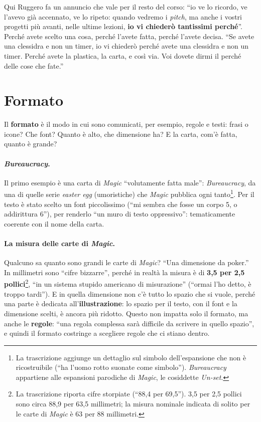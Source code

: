 Qui Ruggero fa un annuncio che vale per il resto del corso: ``io ve lo ricordo, ve
l'avevo già accennato, ve lo ripeto: quando vedremo i \emph{pitch}, ma anche i vostri
progetti più avanti, nelle ultime lezioni, \textbf{io vi chiederò tantissimi
perché}''. Perché avete scelto una cosa, perché l'avete fatta, perché l'avete decisa.
``Se avete una clessidra e non un timer, io vi chiederò perché avete una clessidra e non
un timer. Perché avete la plastica, la carta, e così via. Voi dovete dirmi il perché
delle cose che fate.''

\section{Formato}
\label{a10:sec:formato}



Il \textbf{formato} è il modo in cui sono comunicati, per esempio, regole e testi:
frasi o icone? Che font? Quanto è alto, che dimensione ha? E la carta, com'è fatta,
quanto è grande?

\paragraph{\emph{Bureaucracy}.} Il primo esempio è una carta di \emph{Magic} ``volutamente
fatta male'': \emph{Bureaucracy}, da una di quelle serie \emph{easter egg} (umoristiche)
che \emph{Magic} pubblica ogni tanto\footnote{La trascrizione aggiunge un dettaglio
sul simbolo dell'espansione che non è ricostruibile (``ha l'uomo rotto suonate come
simbolo''). \emph{Bureaucracy} appartiene alle espansioni parodiche di \emph{Magic}, le
cosiddette \emph{Un-set}.}. Per il testo è stato scelto un font piccolissimo (``mi
sembra che fosse un corpo 5, o addirittura 6''), per renderlo ``un muro di testo
oppressivo'': tematicamente coerente con il nome della carta.

\paragraph{La misura delle carte di \emph{Magic}.} Qualcuno sa quanto sono grandi le
carte di \emph{Magic}? ``Una dimensione da poker.'' In millimetri sono ``cifre
bizzarre'', perché in realtà la misura è di \textbf{3,5 per 2,5 pollici}\footnote{La
trascrizione riporta cifre storpiate (``88,4 per 69,5''). 3,5 per 2,5 pollici sono circa
88,9 per 63,5 millimetri; la misura nominale indicata di solito per le carte di
\emph{Magic} è 63 per 88 millimetri.}, ``in un sistema stupido americano di
misurazione'' (``ormai l'ho detto, è troppo tardi''). E in quella dimensione non c'è
tutto lo spazio che si vuole, perché una parte è dedicata all'\textbf{illustrazione}:
lo spazio per il testo, con il font e la dimensione scelti, è ancora più ridotto.
Questo non impatta solo il formato, ma anche le \textbf{regole}: ``una regola complessa
sarà difficile da scrivere in quello spazio'', e quindi il formato costringe a scegliere
regole che ci stiano dentro.

